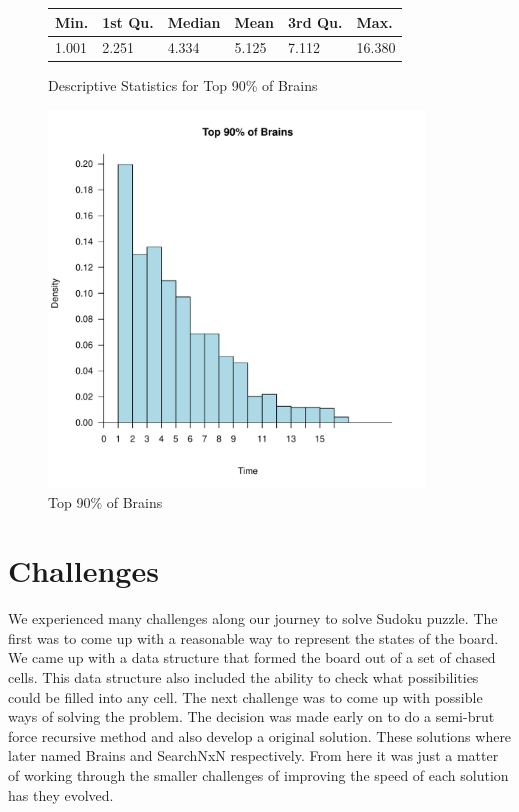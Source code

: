 \documentclass[letterpaper]{article}
\begin{document}
\begin{figure}[h]
	\centering
	\begin{tabular}{|l|l|l|l|l|l|}
		\hline
		Min. & 1st Qu.  & Median & Mean & 3rd Qu. & Max.\\
		\hline
		  1.001  & 2.251 &  4.334  & 5.125 & 7.112 & 16.380\\
		\hline
	\end{tabular}
	\caption{Descriptive Statistics for Top 90\% of Brains}
	\label{fig: 90_perc_brains_table}
\end{figure}

\begin{figure}[h]
	\centering
	\includegraphics[width=100mm]{../stats/Top90Brains.pdf}
	\caption{Top 90\% of Brains}
	\label{fig: 90_perc_brains_dist}
\end{figure}

\section{Challenges}
We experienced many challenges along our journey to solve Sudoku puzzle. The first was to come up with a reasonable way to represent the states of the board. We came up with a data structure that formed the board out of a set of chased cells. This data structure also included the ability to check what possibilities could be filled into any cell. The next challenge was to come up with possible ways of solving the problem. The decision was made early on to do a semi-brut force recursive method and also develop a original solution. These solutions where later named Brains and SearchNxN respectively. From here it was just a matter of working through the smaller challenges of improving the speed of each solution has they evolved.
\end{document}
